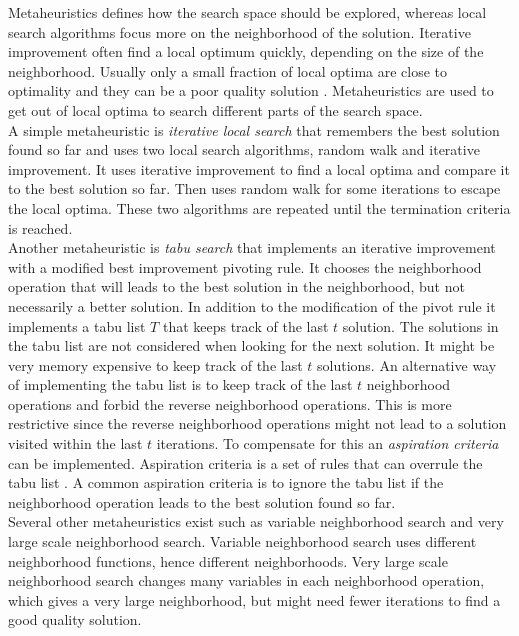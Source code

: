Metaheuristics defines how the search space should be explored, whereas local search algorithms focus more on 
the neighborhood of the solution. Iterative improvement often find a local optimum quickly, depending on the size of 
the neighborhood. Usually only a small fraction of local optima are close to optimality and they can be a poor quality 
solution \cite[p.135]{lsbog}. Metaheuristics are used to get out of local optima to search different parts of the 
search space. \\
A simple metaheuristic is \emph{iterative local search} that remembers the best solution found so far and uses two 
local search algorithms, random walk and iterative improvement. It uses iterative improvement 
to find a local optima and compare it to the best solution so far. Then uses random walk for some iterations to escape 
the local optima. These two algorithms are repeated until the termination criteria is reached. \\ 
Another metaheuristic is \emph{tabu search} that implements an iterative improvement with a modified best improvement 
pivoting rule. It chooses the neighborhood operation that will leads to the best solution in the neighborhood, but not 
necessarily a better solution. In addition to the modification of the pivot rule it implements a tabu list $T$ that 
keeps track of the last $t$ solution. The solutions in the tabu list are not considered when looking for the next 
solution. It might be very memory expensive to keep track of the last $t$ solutions. An alternative way of implementing 
the tabu list is to keep track of the last $t$ neighborhood operations and forbid the reverse neighborhood operations. 
This is more restrictive since the reverse neighborhood operations might not lead to a solution visited within 
the last $t$ iterations. To compensate for this an \emph{aspiration criteria} can be implemented. Aspiration criteria 
is 
a set of rules that can overrule the tabu list \cite[p.139-140]{lsbog}. A common aspiration criteria is to ignore the 
tabu list if the neighborhood operation leads to the best solution found so far. \\
Several other metaheuristics exist such as variable neighborhood search and very large scale neighborhood 
search. Variable neighborhood search uses different neighborhood functions, hence different neighborhoods. Very large 
scale neighborhood search changes many variables in each neighborhood operation, which gives a very large neighborhood, 
but might need fewer iterations to find a good quality solution. 